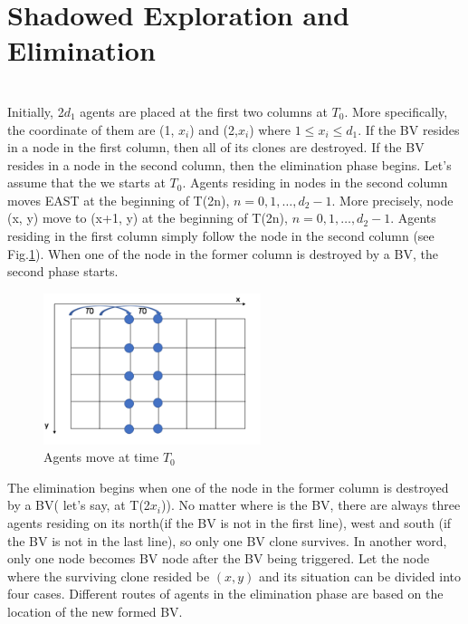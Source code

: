 \section{Shadowed Exploration and Elimination}
 \\
Initially, 2$d_1$ agents are placed at the first two columns at $T_0$. More specifically, the coordinate of them are (1, $x_i$) and (2,$x_i$) where $1\leq x_i\leq d_1$. If the BV resides in a node in the first column, then all of its clones are destroyed. If the BV resides in a node in the second column, then the elimination phase begins. Let's assume that the we starts at $T_0$. Agents residing in nodes in the second column moves EAST at the beginning of T(2n), $n=0,1, \ldots ,d_2-1$. More precisely, node (x, y) move to (x+1, y) at the beginning of T(2n), $n=0,1, \dots , d_2-1$. Agents residing in the first column simply follow the node in the second column (see  Fig.\ref{fig:TShE}). When one of the node in the former column is destroyed by a BV, the second phase starts.
\begin{figure}[H]
  \centering  
  \includegraphics[width=2.5in]{figures/TShE.png}
  \caption{Agents move at time $T_0$}\label{fig:TShE}
\end{figure}
The elimination begins when one of the node in the former column is destroyed by a BV( let's say, at T(2$x_i$)). No matter where is the BV, there are always three agents residing on its north(if the BV is not in the first line), west and south (if the BV is not in the last line), so only one BV clone survives. In another word, only one node becomes BV node after the BV being triggered. Let the node where the surviving clone resided be $(x, y)$ and its situation can be divided into four cases. Different routes of agents in the elimination phase are based on the location of the new formed BV.
